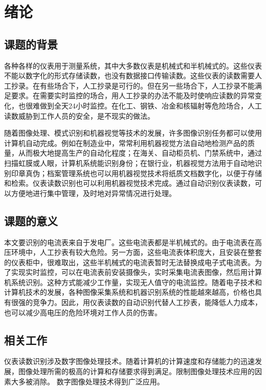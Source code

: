 
\chapter{绪论}

\section{课题的背景}

各种各样的仪表用于测量系统，其中大多数仪表是机械式和半机械式的。这些仪表不能以数字化的形式存储读数，也没有数据接口传输读数。这些仪表的读数需要人工抄录。在有些场合下，人工抄录是可行的。但在另一些场合下，人工抄录不能满足要求。在需要实时监控的场合，用人工抄录的办法不能及时使响应读数的异常变化，也很难做到全天24小时监控。在化工、钢铁、冶金和核辐射等危险场合，人工读数威胁到工作人员的安全，是不现实的做法。

随着图像处理、模式识别和机器视觉等技术的发展，许多图像识别任务都可以使用计算机自动完成。例如在制造业中，常常利用机器视觉方法自动地检测产品的质量，从而极大地提高生产的自动化程度；在海关、自动柜员机、门禁系统中，通过扫描虹膜或人眼，计算机系统能识别身份；在银行业，机器视觉方法用于自动地识别印章真伪；档案管理系统也可以用机器视觉技术将纸质文档数字化，以便于存储和检索。仪表读数识别也可以利用机器视觉技术完成。通过自动识别仪表读数，可以方便地进行集中管理，及时地对异常情况进行处理。



\section{课题的意义}

本文要识别的电流表来自于发电厂。这些电流表都是半机械式的。由于电流表在高压环境中，人工抄表有较大危险。另一方面，这些电流表体积庞大，且安装在整套的仪表柜中，很难取出，这些半机械式的电流表暂时无法替换成电子式电流表。为了实现实时监控，可以在电流表前安装摄像头，实时采集电流表图像，然后用计算机系统识别。这种方式能减少工作量，实现无人值守的电流监控。随着电子技术和计算机技术的发展，各种图像采集系统和机器识别系统的性能越來越高，价格也具有很强的竞争力。因此，用仪表读数的自动识别代替人工抄表，能降低人力成本，也可以减少高电压的危险环境对工作人员的伤害。

\section{相关工作}

仪表读数识别涉及数字图像处理技术。随着计算机的计算速度和存储能力的迅速发展，图像处理所需的极高的计算和存储要求得到满足。限制图像处理技术应用的因素大多被消除。 数字图像处理技术得到广泛应用。

